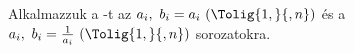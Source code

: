 Alkalmazzuk a -t az $a_{i},\ b_{i}=a_{i}\ (\Tolig{1,}{,n})$ és a
$a_{i},\ b_{i}=\frac{1}{a_{i}}\ (\Tolig{1,}{,n})$ sorozatokra.
